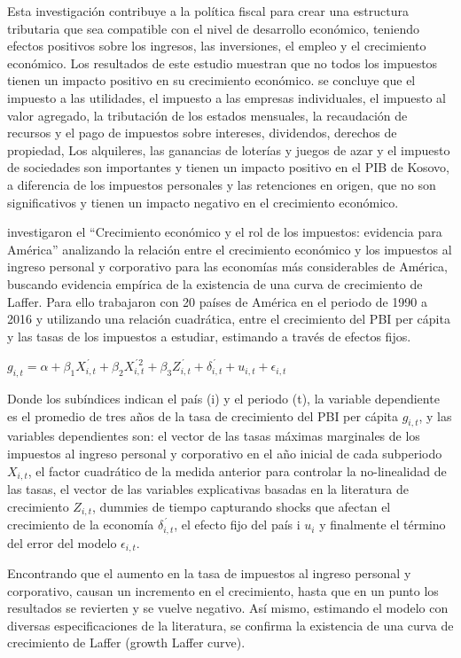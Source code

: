 \documentclass[
  letterpaper,
]{article}
\begin{document}
Esta investigación contribuye a la política fiscal para crear una
estructura tributaria que sea compatible con el nivel de desarrollo
económico, teniendo efectos positivos sobre los ingresos, las
inversiones, el empleo y el crecimiento económico. Los resultados de
este estudio muestran que no todos los impuestos tienen un impacto
positivo en su crecimiento económico. se concluye que el impuesto a las
utilidades, el impuesto a las empresas individuales, el impuesto al
valor agregado, la tributación de los estados mensuales, la recaudación
de recursos y el pago de impuestos sobre intereses, dividendos, derechos
de propiedad, Los alquileres, las ganancias de loterías y juegos de azar
y el impuesto de sociedades son importantes y tienen un impacto positivo
en el PIB de Kosovo, a diferencia de los impuestos personales y las
retenciones en origen, que no son significativos y tienen un impacto
negativo en el crecimiento económico.

\textcite{chiappelo_crecimiento_2018} investigaron el ``Crecimiento
económico y el rol de los impuestos: evidencia para América'' analizando
la relación entre el crecimiento económico y los impuestos al ingreso
personal y corporativo para las economías más considerables de América,
buscando evidencia empírica de la existencia de una curva de crecimiento
de Laffer. Para ello trabajaron con 20 países de América en el periodo
de 1990 a 2016 y utilizando una relación cuadrática, entre el
crecimiento del PBI per cápita y las tasas de los impuestos a estudiar,
estimando a través de efectos fijos.

\(g_{i, t} = \alpha + \beta_{1}X_{i, t}^{´} + \beta_{2}X_{i, t}^{´2} + \beta_{3}Z_{i, t}^{´} + \delta_{i, t}^{´} + u_{i, t} + \epsilon_{i, t}\)

Donde los subíndices indican el país (i) y el periodo (t), la variable
dependiente es el promedio de tres años de la tasa de crecimiento del
PBI per cápita \(g_{i, t}\), y las variables dependientes son: el vector
de las tasas máximas marginales de los impuestos al ingreso personal y
corporativo en el año inicial de cada subperiodo \(X_{i, t}\), el factor
cuadrático de la medida anterior para controlar la no-linealidad de las
tasas, el vector de las variables explicativas basadas en la literatura
de crecimiento \(Z_{i, t}\), dummies de tiempo capturando shocks que
afectan el crecimiento de la economía \(\delta_{i, t}^{´}\), el efecto
fijo del país i \(u_{i}\) y finalmente el término del error del modelo
\(\epsilon_{i, t}\).

Encontrando que el aumento en la tasa de impuestos al ingreso personal y
corporativo, causan un incremento en el crecimiento, hasta que en un
punto los resultados se revierten y se vuelve negativo. Así mismo,
estimando el modelo con diversas especificaciones de la literatura, se
confirma la existencia de una curva de crecimiento de Laffer (growth
Laffer curve).
\end{document}
